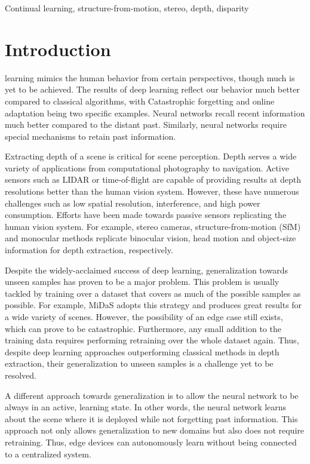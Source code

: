 \documentclass[lettersize,journal]{IEEEtran}
\begin{document}
\begin{IEEEkeywords}
Continual learning, structure-from-motion, stereo, depth, disparity
\end{IEEEkeywords}


\section{Introduction}
 learning mimics the human behavior from certain perspectives, though much is yet to be achieved. The results of deep learning reflect our behavior much better compared to classical algorithms, with Catastrophic forgetting \cite{kirkpatrick2017overcoming} and online adaptation being two specific examples. Neural networks recall recent information much better compared to the distant past. Similarly, neural networks require special mechanisms to retain past information. 
 
 Extracting depth of a scene is critical for scene perception. Depth serves a wide variety of applications from computational photography to navigation. Active sensors such as LIDAR or time-of-flight are capable of providing results at depth resolutions better than the human vision system. However, these have numerous challenges such as low spatial resolution, interference, and high power consumption. Efforts have been made towards passive sensors replicating the human vision system. For example, stereo cameras, structure-from-motion (SfM) and monocular methods replicate binocular vision, head motion and object-size information for depth extraction, respectively. 
 
 Despite the widely-acclaimed success of deep learning, generalization towards unseen samples has proven to be a major problem. This problem is usually tackled by training over a dataset that covers as much of the possible samples as possible. For example, MiDaS \cite{ranftl2019towards} adopts this strategy and produces great results for a wide variety of scenes. However, the possibility of an edge case still exists, which can prove to be catastrophic. Furthermore, any small addition to the training data requires performing retraining over the whole dataset again. Thus, despite deep learning approaches outperforming classical methods in depth extraction, their generalization to unseen samples is a challenge yet to be resolved. 
 
 A different approach towards generalization is to allow the neural network to be always in an active, learning state. In other words, the neural network learns about the scene where it is deployed while not forgetting past information. This approach not only allows generalization to new domains but also does not require retraining. Thus, edge devices can autonomously learn without being connected to a centralized system. 
 
\end{document}
